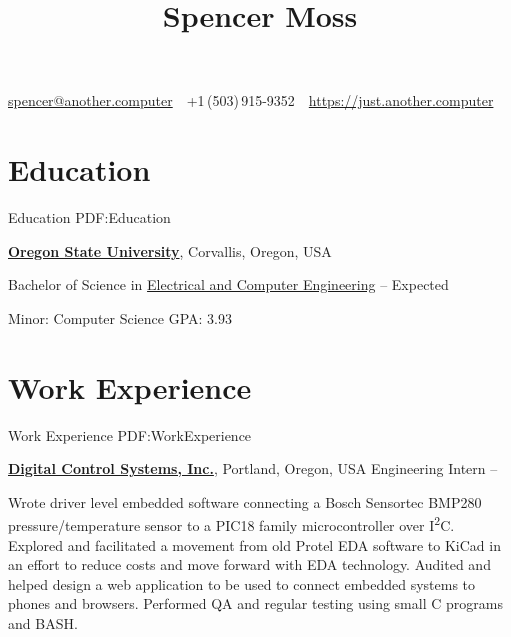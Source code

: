 \documentclass[letterpaper,MMMyyyy,nonstop]{simpleresumecv}
\newcommand{\CVAuthor}{Spencer Moss}
\newcommand{\CVWebpage}{https://just.another.computer}
\begin{document}

\title{\CVAuthor}

\begin{subtitle}
\iffalse
    28627 SW Crestwood Dr, Wilsonville, Oregon, 97070 USA
\fi

\par
\href{mailto:spencer@another.computer}
{spencer@another.computer}
\,\SubBulletSymbol\,
+1\,(503)\,915-9352
\,\SubBulletSymbol\,
\href{\CVWebpage}
{\CVWebpage}
\end{subtitle}

\begin{body}


\section
{Education}
{Education}
{PDF:Education}

\href{http://www.oregonstate.edu/}
{\textbf{Oregon State University}},
Corvallis, Oregon, USA

\GapNoBreak
\BulletItem
Bachelor of Science in
\href{http://www.eecs.oregonstate.edu/}
{Electrical and Computer Engineering}
\hfill
{} -- Expected 
\begin{detail}
\SubBulletItem
Minor: Computer Science
\SubBulletItem
GPA: 3.93
\iffalse
\SubBulletItem
Current Interest Areas:
FOSS/Linux, Embedded Systems, Controls/Sensor Systems, Computer Architecture \& Networks, VLSI
\fi
\end{detail}


\section
{Work\newline
Experience}
{Work Experience}
{PDF:WorkExperience}

\href{http://www.dcs-inc.net}
{\textbf{Digital Control Systems, Inc.}},
Portland, Oregon, USA
\GapNoBreak
\BulletItem
Engineering Intern
\hfill
{} --
\begin{detail}
\SubBulletItem
Wrote driver level embedded software connecting a Bosch Sensortec BMP280 pressure/temperature sensor to a PIC18 family microcontroller over I\textsuperscript{2}C.
\SubBulletItem
Explored and facilitated a movement from old Protel EDA software to KiCad in an effort to reduce costs and move forward with EDA technology.
\SubBulletItem
Audited and helped design a web application to be used to connect embedded systems to phones and browsers. Performed QA and regular testing using small C programs and BASH.
\end{detail}


\end{body}
\end{document}
